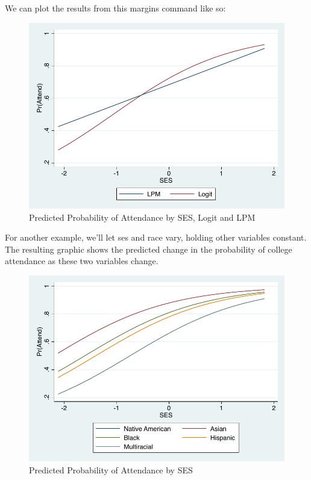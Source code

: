 \documentclass[12pt]{article}
\begin{document}
We can plot the results from this margins command like so: 



\begin{figure}[h]
  \centering
  \includegraphics[width=\textwidth]{logit_basic}
  \caption{Predicted Probability of Attendance by SES, Logit and LPM}
\end{figure}


For another example, we'll let ses and race vary, holding other
variables constant. The resulting graphic shows the predicted change
in the probability of college attendance as these two variables
change. 


\begin{figure}[h]
  \centering
  \includegraphics[width=\textwidth]{logit_race}
  \caption{Predicted Probability of Attendance by SES}
\end{figure}
\end{document}

